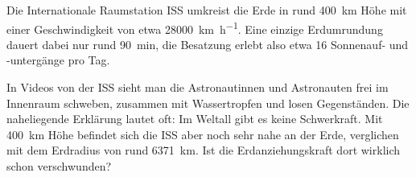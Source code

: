 \documentclass[addpoints,11pt,a4paper]{exam}
\begin{document}
\begin{beispielbox}
Die Internationale Raumstation ISS umkreist die Erde in rund
\SI{400}{\kilo\meter} Höhe mit einer Geschwindigkeit von etwa
\SI{28000}{\kilo\meter\per\hour}. Eine einzige Erdumrundung dauert dabei
nur rund \SI{90}{\minute}, die Besatzung erlebt also etwa 16
Sonnenauf- und -untergänge pro Tag.

In Videos von der ISS sieht man die Astronautinnen und Astronauten frei
im Innenraum schweben, zusammen mit Wassertropfen und losen Gegenständen.
Die naheliegende Erklärung lautet oft: \glqq Im Weltall gibt es keine
Schwerkraft.\grqq{} Mit \SI{400}{\kilo\meter} Höhe befindet sich die ISS
aber noch sehr nahe an der Erde, verglichen mit dem Erdradius von rund
\SI{6371}{\kilo\meter}. Ist die Erdanziehungskraft dort wirklich schon
verschwunden?
\end{beispielbox}
\end{document}
